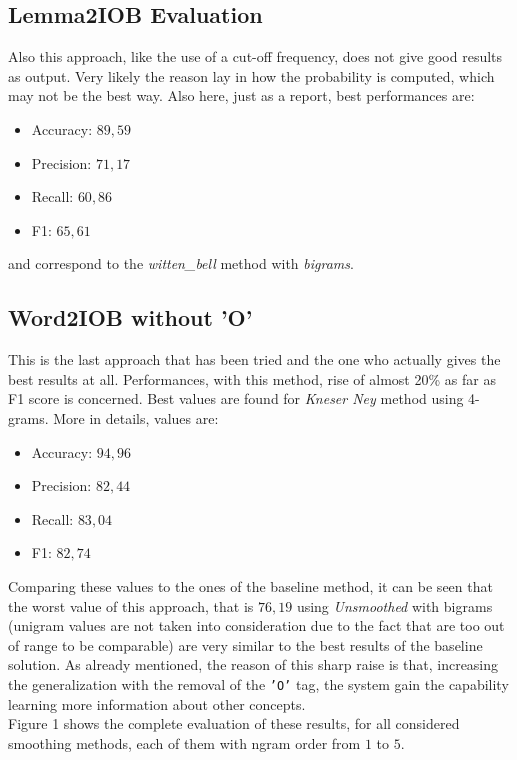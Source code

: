 \documentclass[11pt,a4paper]{article}
\begin{document}
\subsection{Lemma2IOB Evaluation}

Also this approach, like the use of a cut-off frequency, does not give good results as output. Very likely the reason lay in how the probability is computed, which may not be the best way. Also here, just as a report, best performances are:
\begin{itemize}
	\item Accuracy: $89,59$
	\item Precision: $71,17$
	\item Recall: $60,86$
	\item F1: $65,61$
\end{itemize}
and correspond to the \textit{witten\_bell} method with \textit{bigrams}.


\subsection{Word2IOB without 'O'}

This is the last approach that has been tried and the one who actually gives the best results at all. Performances, with this method, rise of almost 20\% as far as F1 score is concerned. Best values are found for \textit{Kneser Ney} method using 4-grams. More in details, values are:
\begin{itemize}
	\item Accuracy: $94,96$
	\item Precision: $82,44$
	\item Recall: $83,04$
	\item F1: $82,74$
\end{itemize}

Comparing these values to the ones of the baseline method, it can be seen that the worst value of this approach, that is $76,19$ using \textit{Unsmoothed} with bigrams (unigram values are not taken into consideration due to the fact that are too out of range to be comparable) are very similar to the best results of the baseline solution. As already mentioned, the reason of this sharp raise is that, increasing the generalization with the removal of the {\tt 'O'} tag, the system gain the capability learning more information about other concepts.\\
Figure 1 shows the complete evaluation of these results, for all considered smoothing methods, each of them with ngram order from $1$ to $5$.
\end{document}
